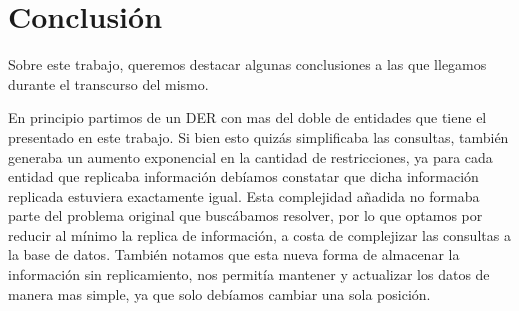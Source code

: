 \section{Conclusión}

Sobre este trabajo, queremos destacar algunas conclusiones a las que llegamos durante el transcurso del mismo. 

En principio partimos de un DER con mas del doble de entidades que tiene el presentado en este trabajo. Si bien esto quizás simplificaba las consultas, también generaba un aumento exponencial en la cantidad de restricciones, ya para cada entidad que replicaba información debíamos constatar que dicha información replicada estuviera exactamente igual. Esta complejidad añadida no formaba parte del problema original que buscábamos resolver, por lo que optamos por reducir al mínimo la replica de información, a costa de complejizar las consultas a la base de datos. También notamos que esta nueva forma de almacenar la información sin replicamiento, nos permitía mantener y actualizar los datos de manera mas simple, ya que solo debíamos cambiar una sola posición.